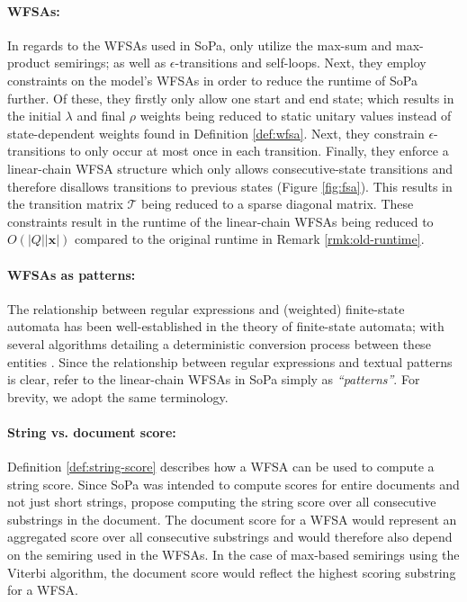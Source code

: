 \paragraph{WFSAs:} In regards to the WFSAs used in SoPa, \citet{schwartz2018sopa} only utilize the max-sum and max-product semirings; as well as $\epsilon$-transitions and self-loops. Next, they employ constraints on the model's WFSAs in order to reduce the runtime of SoPa further. Of these, they firstly only allow one start and end state; which results in the initial $\lambda$ and final $\rho$ weights being reduced to static unitary values instead of state-dependent weights found in Definition \ref{def:wfsa}. Next, they constrain $\epsilon$-transitions to only occur at most once in each transition. Finally, they enforce a linear-chain WFSA structure which only allows consecutive-state transitions and therefore disallows transitions to previous states (Figure \ref{fig:fsa}). This results in the transition matrix $\mathcal{T}$ being reduced to a sparse diagonal matrix. These constraints result in the runtime of the linear-chain WFSAs being reduced to $O(|Q||\pmb{x}|)$ compared to the original runtime in Remark \ref{rmk:old-runtime}.

\paragraph{WFSAs as patterns:} The relationship between regular expressions and (weighted) finite-state automata has been well-established in the theory of finite-state automata; with several algorithms detailing a deterministic conversion process between these entities \citep{thompson1968programming,jiang2020cold}. Since the relationship between regular expressions and textual patterns is clear, \citet{schwartz2018sopa} refer to the linear-chain WFSAs in SoPa simply as \textit{``patterns''}. For brevity, we adopt the same terminology.

\paragraph{String vs. document score:} Definition \ref{def:string-score} describes how a WFSA can be used to compute a string score. Since SoPa was intended to compute scores for entire documents and not just short strings, \citet{schwartz2018sopa} propose computing the string score over all consecutive substrings in the document. The document score for a WFSA would represent an aggregated score over all consecutive substrings and would therefore also depend on the semiring used in the WFSAs. In the case of max-based semirings using the Viterbi algorithm, the document score would reflect the highest scoring substring for a WFSA.

